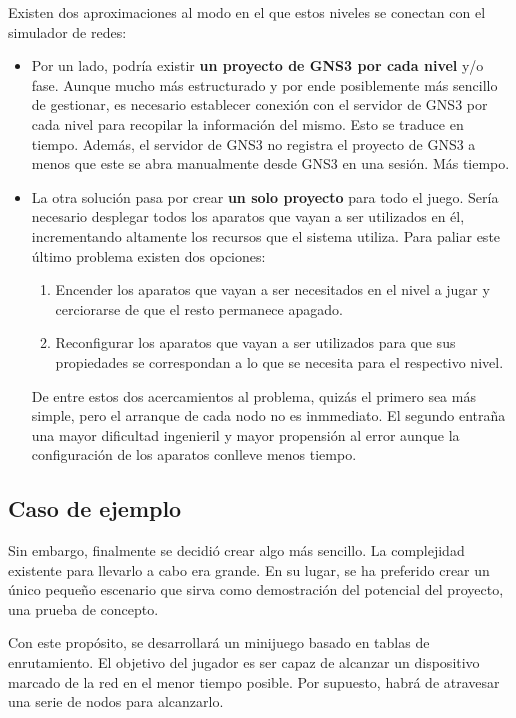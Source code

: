 Existen dos aproximaciones al modo en el que estos niveles se conectan con el simulador de redes:
\begin{itemize}
\item Por un lado, podría existir \textbf{un proyecto de GNS3 por cada nivel} y/o fase. Aunque mucho más estructurado y por ende posiblemente más sencillo de gestionar, es necesario establecer conexión con el servidor de GNS3 por cada nivel para recopilar la información del mismo. Esto se traduce en tiempo. Además, el servidor de GNS3 no registra el proyecto de GNS3 a menos que este se abra manualmente desde GNS3 en una sesión. Más tiempo.
\item La otra solución pasa por crear \textbf{un solo proyecto} para todo el juego. Sería necesario desplegar todos los aparatos que vayan a ser utilizados en él, incrementando altamente los recursos que el sistema utiliza. Para paliar este último problema existen dos opciones:
\begin{enumerate}
\item Encender los aparatos que vayan a ser necesitados en el nivel a jugar y cerciorarse de que el resto permanece apagado.
\item Reconfigurar los aparatos que vayan a ser utilizados para que sus propiedades se correspondan a lo que se necesita para el respectivo nivel.
\end{enumerate}
De entre estos dos acercamientos al problema, quizás el primero sea más simple, pero el arranque de cada nodo no es inmmediato. El segundo entraña una mayor dificultad ingenieril y mayor propensión al error aunque la configuración de los aparatos conlleve menos tiempo.
\end{itemize}

\subsection{Caso de ejemplo}\label{subsec:fracasojuego}

Sin embargo, finalmente se decidió crear algo más sencillo. La complejidad existente para llevarlo a cabo era grande. En su lugar, se ha preferido crear un único pequeño escenario que sirva como demostración del potencial del proyecto, una prueba de concepto.

Con este propósito, se desarrollará un minijuego basado en tablas de enrutamiento. El objetivo del jugador es ser capaz de alcanzar un dispositivo marcado de la red en el menor tiempo posible. Por supuesto, habrá de atravesar una serie de nodos para alcanzarlo.

